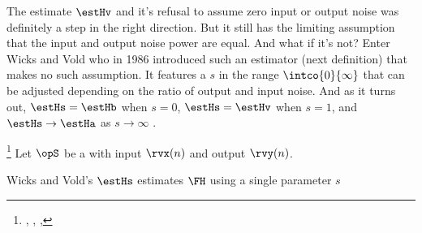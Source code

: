 The estimate $\estHv$ and it's refusal to assume zero input or output noise
was definitely a step in the right direction.
But it still has the limiting assumption that the input and output noise power are equal.
And what if it's not?
Enter Wicks and Vold who in 1986 introduced such an estimator (next definition)
that makes no such assumption.
It features a  $s$ in the range $\intco{0}{\infty}$
that can be adjusted depending on the ratio of output and input noise.
And as it turns out, $\estHs = \estHb$ when $s=0$, $\estHs=\estHv$ when $s=1$, and
$\estHs\to\estHa$ as $s\to\infty$  .
\begin{definition}                                                                %
\footnote{                                                                        %
  ,         %
  ,                        %
  ,           %
  }                                                                               %
\label{def:Hs}                                                                    %
Let $\opS$ be a  with input $\rvx(n)$ and output $\rvy(n)$.
\end{definition}
Wicks and Vold's $\estHs$ estimates $\FH$ using a single parameter $s$
